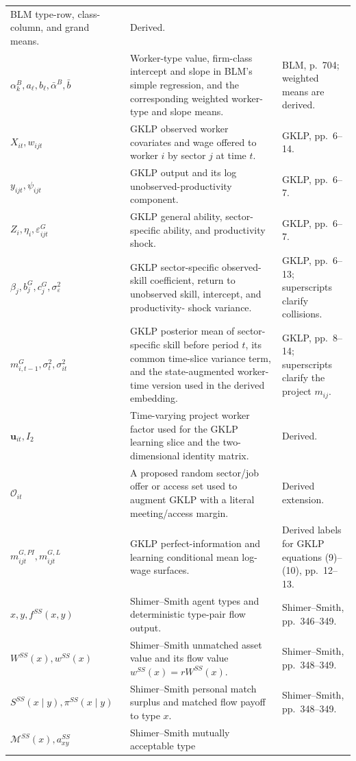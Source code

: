 \documentclass[11pt]{article}
\begin{document}
\begin{longtable}{p{}p{}p{}}
BLM type-row, class-column, and grand means. & Derived. \\
\(\alpha_k^B,a_\ell,b_\ell,\bar\alpha^B,\bar b\) & Worker-type value,
firm-class intercept and slope in BLM's simple regression, and the
corresponding weighted worker-type and slope means. & BLM, p.\ 704; weighted
means are derived. \\
\(X_{it},w_{ijt}\) & GKLP observed worker covariates and wage offered to
worker \(i\) by sector \(j\) at time \(t\). & GKLP, pp.\ 6--14. \\
\(y_{ijt},\psi_{ijt}\) & GKLP output and its log unobserved-productivity
component. & GKLP, pp.\ 6--7. \\
\(Z_i,\eta_i,\varepsilon_{ijt}^G\) & GKLP general ability, sector-specific
ability, and productivity shock. & GKLP, pp.\ 6--7. \\
\(\beta_j,b_j^G,c_j^G,\sigma_\varepsilon^2\) & GKLP sector-specific observed-
skill coefficient, return to unobserved skill, intercept, and productivity-
shock variance. & GKLP, pp.\ 6--13; superscripts clarify collisions. \\
\(m_{i,t-1}^G,\sigma_t^2,\sigma_{it}^2\) & GKLP posterior mean of
sector-specific skill before period \(t\), its common time-slice variance
term, and the state-augmented worker-time version used in the derived
embedding. & GKLP, pp.\ 8--14; superscripts clarify the project \(m_{ij}\). \\
\(\mathbf u_{it},I_2\) & Time-varying project worker factor used for the
GKLP learning slice and the two-dimensional identity matrix. & Derived. \\
\(\mathcal O_{it}\) & A proposed random sector/job offer or access set used
to augment GKLP with a literal meeting/access margin. & Derived extension. \\
\(m_{ijt}^{G,PI},m_{ijt}^{G,L}\) & GKLP perfect-information and learning
conditional mean log-wage surfaces. & Derived labels for GKLP equations
(9)--(10), pp.\ 12--13. \\
\(x,y,f^{SS}(x,y)\) & Shimer--Smith agent types and deterministic type-pair
flow output. & Shimer--Smith, pp.\ 346--349. \\
\(W^{SS}(x),w^{SS}(x)\) & Shimer--Smith unmatched asset value and its flow
value \(w^{SS}(x)=rW^{SS}(x)\). & Shimer--Smith, pp.\ 348--349. \\
\(S^{SS}(x\mid y),\pi^{SS}(x\mid y)\) & Shimer--Smith personal match surplus
and matched flow payoff to type \(x\). & Shimer--Smith, pp.\ 348--349. \\
\(\mathcal M^{SS}(x),a^{SS}_{xy}\) & Shimer--Smith mutually acceptable type

\end{longtable}
\end{document}
